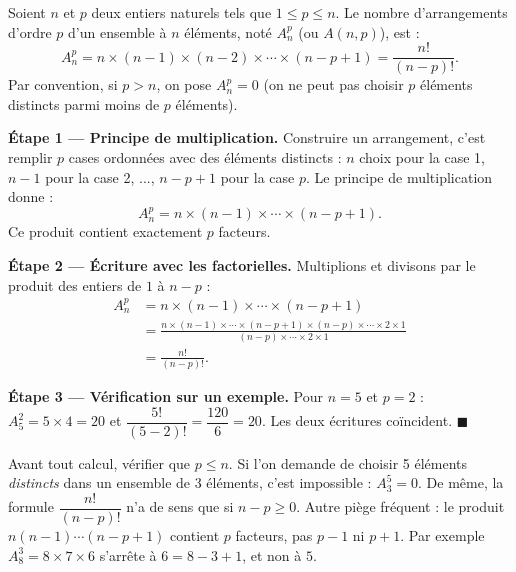 \documentclass[11pt]{article}
\begin{document}
\begin{propriete}
Soient $n$ et $p$ deux entiers naturels tels que $1 \leq p \leq n$. Le nombre d'arrangements d'ordre $p$ d'un ensemble à $n$ éléments, noté $A_n^p$ (ou $A(n,p)$), est :
\[ A_n^p = n \times (n-1) \times (n-2) \times \cdots \times (n-p+1) = \frac{n!}{(n-p)!}. \]
Par convention, si $p > n$, on pose $A_n^p = 0$ (on ne peut pas choisir $p$ éléments distincts parmi moins de $p$ éléments).
\end{propriete}

\begin{experience}[Démonstration guidée de la formule $A_n^p = \dfrac{n!}{(n-p)!}$]
\textbf{Étape 1 — Principe de multiplication.} Construire un arrangement, c'est remplir $p$ cases ordonnées avec des éléments distincts : $n$ choix pour la case 1, $n-1$ pour la case 2, ..., $n-p+1$ pour la case $p$. Le principe de multiplication donne :
\[ A_n^p = n \times (n-1) \times \cdots \times (n-p+1). \]
Ce produit contient exactement $p$ facteurs.

\textbf{Étape 2 — Écriture avec les factorielles.} Multiplions et divisons par le produit des entiers de $1$ à $n-p$ :
\begin{align*}
A_n^p &= n \times (n-1) \times \cdots \times (n-p+1) \\
&= \frac{n \times (n-1) \times \cdots \times (n-p+1) \times (n-p) \times \cdots \times 2 \times 1}{(n-p) \times \cdots \times 2 \times 1} \\
&= \frac{n!}{(n-p)!}.
\end{align*}

\textbf{Étape 3 — Vérification sur un exemple.} Pour $n = 5$ et $p = 2$ : $A_5^2 = 5 \times 4 = 20$ et $\dfrac{5!}{(5-2)!} = \dfrac{120}{6} = 20$. Les deux écritures coïncident. \hfill $\blacksquare$
\end{experience}

\begin{attention}
Avant tout calcul, vérifier que $p \leq n$. Si l'on demande de choisir 5 éléments \emph{distincts} dans un ensemble de 3 éléments, c'est impossible : $A_3^5 = 0$. De même, la formule $\dfrac{n!}{(n-p)!}$ n'a de sens que si $n - p \geq 0$. Autre piège fréquent : le produit $n(n-1)\cdots(n-p+1)$ contient $p$ facteurs, pas $p-1$ ni $p+1$. Par exemple $A_8^3 = 8 \times 7 \times 6$ s'arrête à $6 = 8-3+1$, et non à $5$.
\end{attention}
\end{document}
